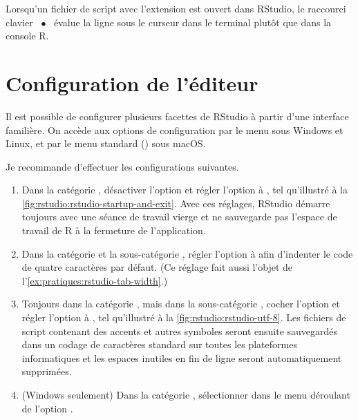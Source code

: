 Lorsqu'un fichier de script avec l'extension  est ouvert
dans RStudio, le raccourci clavier
~$\bullet$~\code{\cmdkey\,\returnkey} évalue la
ligne sous le curseur dans le terminal plutôt que dans la console R.



\section{Configuration de l'éditeur}
\label{sec:rstudio:configuration}

Il est possible de configurer plusieurs facettes de RStudio à partir
d'une interface familière. On accède aux options de configuration par
le menu  sous Windows et Linux, et par le
menu standard  (\code{\cmdkey\,,})
sous macOS.

Je recommande d'effectuer les configurations suivantes.
\begin{enumerate}
\item Dans la catégorie , désactiver l'option
   et régler l'option
   à , tel
  qu'illustré à la \autoref{fig:rstudio:rstudio-startup-and-exit}.
  Avec ces réglages, RStudio démarre toujours avec une séance de
  travail vierge et ne sauvegarde pas l'espace de travail de R à la
  fermeture de l'application.
\item Dans la catégorie  et la sous-catégorie
  , régler l'option  à  afin
  d'indenter le code de quatre caractères par défaut. (Ce réglage fait
  aussi l'objet de l'\autoref{ex:pratiques:rstudio-tab-width}.)
\item Toujours dans la catégorie , mais dans la
  sous-catégorie , cocher l'option  et régler l'option
   à , tel qu'illustré à la
  \autoref{fig:rstudio:rstudio-utf-8}. Les fichiers de script
  contenant des accents et autres symboles seront ensuite sauvegardés
  dans un codage de caractères standard sur toutes les plateformes
  informatiques et les espaces inutiles en fin de ligne seront
  automatiquement supprimées.
\item (Windows seulement) Dans la catégorie ,
  sélectionner  dans le menu déroulant
  de l'option .
\end{enumerate}

